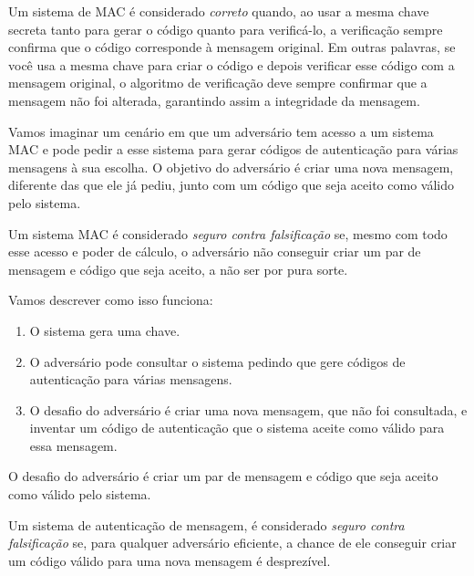 Um sistema de MAC é considerado {\em correto} quando, ao usar a mesma chave secreta tanto para gerar o código quanto para verificá-lo, a verificação sempre confirma que o código corresponde à mensagem original.
Em outras palavras, se você usa a mesma chave para criar o código e depois verificar esse código com a mensagem original, o algoritmo de verificação deve sempre confirmar que a mensagem não foi alterada, garantindo assim a integridade da mensagem.

Vamos imaginar um cenário em que um adversário tem acesso a um sistema MAC e pode pedir a esse sistema para gerar códigos de autenticação para várias mensagens à sua escolha.
O objetivo do adversário é criar uma nova mensagem, diferente das que ele já pediu, junto com um código que seja aceito como válido pelo sistema.

Um sistema MAC é considerado {\em seguro contra falsificação} se, mesmo com todo esse acesso e poder de cálculo, o adversário não conseguir criar um par de mensagem e código que seja aceito, a não ser por pura sorte.

Vamos descrever como isso funciona:
\begin{enumerate}
\item O sistema gera uma chave.
\item O adversário pode consultar o sistema pedindo que gere códigos de autenticação para várias mensagens.
\item O desafio do adversário é criar uma nova mensagem, que não foi consultada, e inventar um código de autenticação que o sistema aceite como válido para essa mensagem.
\end{enumerate}

\begin{center}
\end{center}

O desafio do adversário é criar um par de mensagem e código que seja aceito como válido pelo sistema.

Um sistema de autenticação de mensagem, é considerado {\em seguro contra falsificação} se, para qualquer adversário eficiente, a chance de ele conseguir criar um código válido para uma nova mensagem é desprezível.

